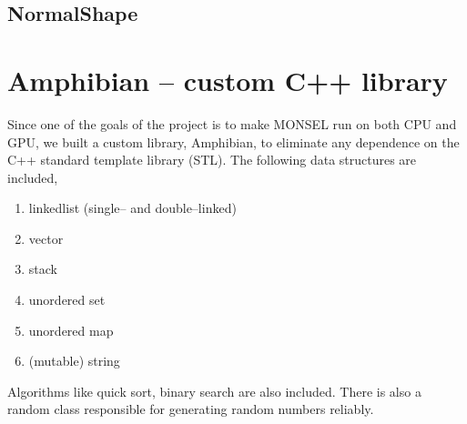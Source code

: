 \subsection{NormalShape}

\section{Amphibian -- custom C++ library}
Since one of the goals of the project is to make MONSEL run on both CPU and GPU, we built a custom library, Amphibian, to eliminate any dependence on the C++ standard template library (STL). The following data structures are included,
\begin{enumerate}
\item linkedlist (single-- and double--linked)
\item vector
\item stack
\item unordered set
\item unordered map
\item (mutable) string
\end{enumerate}

Algorithms like quick sort, binary search are also included. There is also a random class responsible for generating random numbers reliably.
